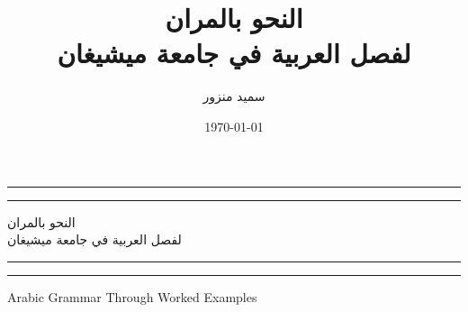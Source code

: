 \documentclass[11pt,twoside]{book}
\title{النحو بالمران\\لفصل العربية في جامعة ميشيغان}
\author{\textarabic{سميد منزور}}
\date{\today} %
\begin{document}
\frontmatter


\begin{titlepage} %

	\centering %
	
	\scshape %
	
	\vspace*{\baselineskip} %
	
	
	\rule{\textwidth}{1.6pt}\vspace*{-\baselineskip}\vspace*{2pt} %
	\rule{\textwidth}{0.4pt} %
	
	\vspace{0.75\baselineskip} %
	
	{\LARGE النحو بالمران\\لفصل العربية في جامعة ميشيغان\\} %
	
	\vspace{0.75\baselineskip} %
	
	\rule{\textwidth}{0.4pt}\vspace*{-\baselineskip}\vspace{3.2pt} %
	\rule{\textwidth}{1.6pt} %
	
	\vspace{2\baselineskip} %
	
	
	\textenglish{Arabic Grammar Through Worked Examples} %
	
	\vspace*{3\baselineskip} %
	
	
	
	\vspace{0.5\baselineskip} %
	
	

\end{titlepage}
\end{document}

